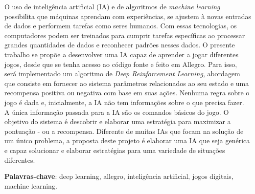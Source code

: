
\setlength{\absparsep}{18pt} %
\begin{resumo}
	O uso de inteligência artificial (IA) e de algoritmos de \textit{machine learning}  possibilita que máquinas aprendam com experiências, se ajustem à novas entradas de dados e performem tarefas como seres humanos. Com essas tecnologias, os computadores podem ser treinados para cumprir tarefas específicas ao processar grandes quantidades de dados e reconhecer padrões nesses dados.
	O presente trabalho se propõe a desenvolver uma IA capaz de aprender a jogar diferentes jogos, desde que se tenha acesso ao código fonte e feito em Allegro. Para isso, será implementado um algoritmo de \textit{Deep Reinforcement Learning}, abordagem que consiste em fornecer ao sistema parâmetros relacionados ao seu estado e uma recompensa positiva ou negativa com base em suas ações. Nenhuma regra sobre o jogo é dada e, inicialmente, a IA não tem informações sobre o que precisa fazer. A única informação passada para a IA são os comandos básicos do jogo. O objetivo do sistema é descobrir e elaborar uma estratégia para maximizar a pontuação - ou a recompensa. Diferente de muitas IAs que focam na solução de um único problema, a proposta deste projeto é elaborar uma IA que seja genérica e capaz solucionar e elaborar estratégias para uma variedade de situações diferentes.

	\vspace{\onelineskip}

	\noindent	
	\textbf{Palavras-chave}: deep learning, allegro, inteligência artificial, jogos digitais, machine learning.
\end{resumo}

